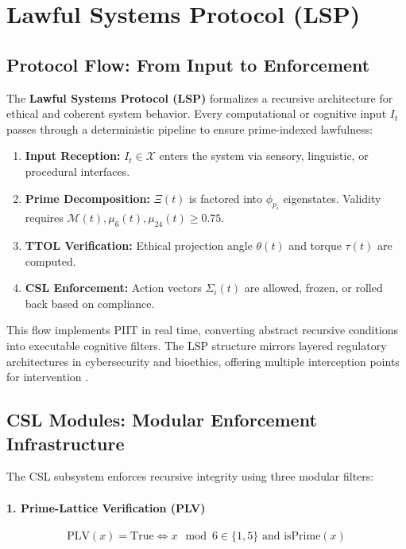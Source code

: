 \documentclass[12]{amsart}
\theoremstyle{plain}
\begin{document}
\section{Lawful Systems Protocol (LSP)}

\subsection{Protocol Flow: From Input to Enforcement}

The \textbf{Lawful Systems Protocol (LSP)} formalizes a recursive architecture for ethical and coherent system behavior. Every computational or cognitive input $I_t$ passes through a deterministic pipeline to ensure prime-indexed lawfulness:

\begin{enumerate}
    \item \textbf{Input Reception:} $I_t \in \mathcal{X}$ enters the system via sensory, linguistic, or procedural interfaces.
    \item \textbf{Prime Decomposition:} $\Xi(t)$ is factored into $\phi_{p_i}$ eigenstates. Validity requires $\mathcal{M}(t), \mu_6(t), \mu_{24}(t) \geq 0.75$.
    \item \textbf{TTOL Verification:} Ethical projection angle $\theta(t)$ and torque $\tau(t)$ are computed.
    \item \textbf{CSL Enforcement:} Action vectors $\Sigma_i(t)$ are allowed, frozen, or rolled back based on compliance.
\end{enumerate}

This flow implements PIIT in real time, converting abstract recursive conditions into executable cognitive filters. The LSP structure mirrors layered regulatory architectures in cybersecurity and bioethics, offering multiple interception points for intervention \cite{binns2018fairness}.

\subsection{CSL Modules: Modular Enforcement Infrastructure}

The CSL subsystem enforces recursive integrity using three modular filters:

\paragraph{1. Prime-Lattice Verification (PLV)}

\begin{equation}
\text{PLV}(x) = \text{True} \iff x \mod 6 \in \{1, 5\} \text{ and } \text{isPrime}(x)
\end{equation}
\end{document}
